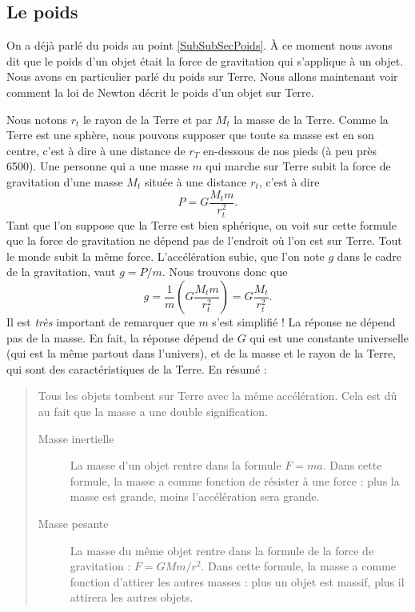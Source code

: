 \subsection{Le poids}		\label{SubSecPoidsGr}

On a déjà parlé du poids au point \ref{SubSubSecPoids}. À ce moment nous avons dit que le poids d'un objet était la force de gravitation qui s'applique à un objet. Nous avons en particulier parlé du poids sur Terre. Nous allons maintenant voir comment la loi de Newton décrit le poids d'un objet sur Terre.

Nous notons $r_t$ le rayon de la Terre et par $M_t$ la masse de la Terre. Comme la Terre est une sphère, nous pouvons supposer que toute sa masse est en son centre, c'est à dire à une distance de $r_T$ en-dessous de nos pieds (à peu près \unit{6500}{\kilo\meter}). Une personne qui a une masse $m$ qui marche sur Terre subit la force de gravitation d'une masse $M_t$ située à une distance $r_t$, c'est à dire
\[ 
  P=G\frac{ M_tm }{ r_t^2 }.
\]
Tant que l'on suppose que la Terre est bien sphérique, on voit sur cette formule que la force de gravitation ne dépend pas de l'endroit où l'on est sur Terre. Tout le monde subit la même force. L'accélération subie, que l'on note $g$ dans le cadre de la gravitation, vaut $g=P/m$. Nous trouvons donc que
\[ 
  g=\frac{1}{ m }\left( G\frac{ M_tm }{ r_t^2 }\right)=G\frac{ M_t }{ r_t^2 }.
\]
Il est \emph{très} important de remarquer que $m$ s'est simplifié ! La réponse ne dépend pas de la masse. En fait, la réponse dépend de $G$ qui est une constante universelle (qui est la même partout dans l'univers), et de la masse et le rayon de la Terre, qui sont des caractéristiques de la Terre. En résumé :
\begin{quote}
Tous les objets tombent sur Terre avec la même accélération. Cela est dû au fait que la masse a une double signification.
\begin{description}
\item[Masse inertielle] La masse d'un objet rentre dans la formule $F=ma$. Dans cette formule, la masse a comme fonction de résister à une force : plus la masse est grande, moins l'accélération sera grande.
\item[Masse pesante] La masse du même objet rentre dans la formule de la force de gravitation : $F=GMm/r^2$. Dans cette formule, la masse a comme fonction d'attirer les autres masses : plus un objet est massif, plus il attirera les autres objets. 
\end{description}
\end{quote}

